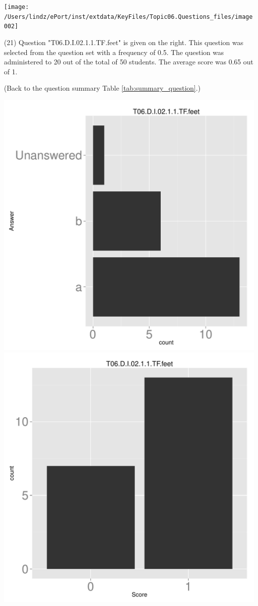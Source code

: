 \documentclass[12pt,english,nohyper]{tufte-handout}\usepackage[]{graphicx}\usepackage[]{color}
\begin{document}
\vspace{5cm}\begin{marginfigure}\texttt{[image: /Users/lindz/ePort/inst/extdata/KeyFiles/Topic06.Questions\_files/image002]}\end{marginfigure}\vspace{-5cm} (21) Question "T06.D.I.02.1.1.TF.feet" is given on the right. This question was selected from the question set with a frequency of 0.5. The question was administered to 20 out of the total of 50 students. The average score was 0.65 out of 1.

 (Back to the question summary Table \ref{tab:summary_question}.)

\begin{center} \includegraphics[width=.45\linewidth]{Topic06_AB_21_answer} \includegraphics[width=.45\linewidth]{Topic06_AB_21_score} \end{center} 
\end{document}
